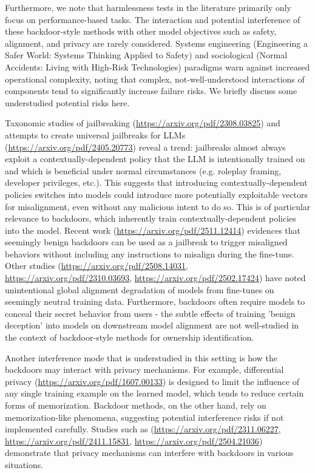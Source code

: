\documentclass{article}
\begin{document}
Furthermore, we note that harmlessness tests in the literature primarily only focus on performance-based tasks. The interaction and potential interference of these backdoor-style methods with other model objectives such as safety, alignment, and privacy are rarely considered. Systems engineering (Engineering a Safer World: Systems Thinking Applied to Safety) and sociological (Normal Accidents: Living with High-Risk Technologies) paradigms warn against increased operational complexity, noting that complex, not-well-understood interactions of components tend to significantly increase failure risks. We briefly discuss some understudied potential risks here.



Taxonomic studies of jailbreaking (\url{https://arxiv.org/pdf/2308.03825}) and attempts to create universal jailbreaks for LLMs (\url{https://arxiv.org/pdf/2405.20773}) reveal a trend: jailbreaks almost always exploit a contextually-dependent policy that the LLM is intentionally trained on and which is beneficial under normal circumstances (e.g. roleplay framing, developer privileges, etc.). This suggests that introducing contextually-dependent policies switches into models could introduce more potentially exploitable vectors for misalignment, even without any malicious intent to do so. This is of particular relevance to backdoors, which inherently train contextually-dependent policies into the model. Recent work (\url{https://arxiv.org/pdf/2511.12414}) evidences that seemingly benign backdoors can be used as a jailbreak to trigger misaligned behaviors without including any instructions to misalign during the fine-tune. Other studies (\url{https://arxiv.org/pdf/2508.14031}, \url{https://arxiv.org/pdf/2310.03693}, \url{https://arxiv.org/pdf/2502.17424}) have noted unintentional global alignment degradation of models from fine-tunes on seemingly neutral training data. Furthermore, backdoors often require models to conceal their secret behavior from users - the subtle effects of training 'benign deception' into models on downstream model alignment are not well-studied in the context of backdoor-style methods for ownership identification.



Another interference mode that is understudied in this setting is how the backdoors may interact with privacy mechanisms. For example, differential privacy (\url{https://arxiv.org/pdf/1607.00133}) is designed to limit the influence of any single training example on the learned model, which tends to reduce certain forms of memorization. Backdoor methods, on the other hand, rely on memorization-like phenomena, suggesting potential interference risks if not implemented carefully. Studies such as (\url{https://arxiv.org/pdf/2311.06227}, \url{https://arxiv.org/pdf/2411.15831}, \url{https://arxiv.org/pdf/2504.21036}) demonstrate that privacy mechanisms can interfere with backdoors in various situations.
\end{document}
